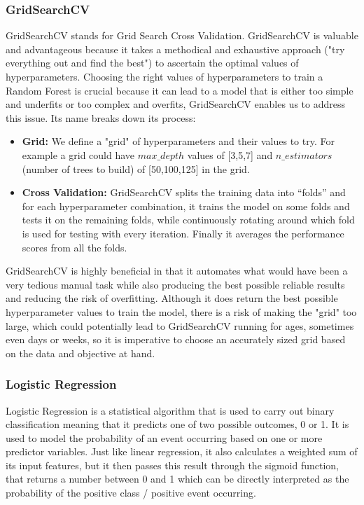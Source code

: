 	\subsubsection{GridSearchCV}
	GridSearchCV stands for Grid Search Cross Validation. GridSearchCV is valuable and advantageous because it takes a methodical and exhaustive approach ("try everything out and find the best") to ascertain the optimal values of hyperparameters. Choosing the right values of hyperparameters to train a Random Forest is crucial because it can lead to a model that is either too simple and underfits or too complex and overfits, GridSearchCV enables us to address this issue. Its name breaks down its process:
	\begin{itemize}
		\item \textbf{Grid:} We define a "grid" of hyperparameters and their values to try. For example a grid could have $max\_depth$ values of [3,5,7] and $n\_estimators$ (number of trees to build) of [50,100,125] in the grid.
		\item \textbf{Cross Validation:} GridSearchCV splits the training data into ``folds'' and for each hyperparameter combination, it trains the model on some folds and tests it on the remaining folds, while continuously rotating around which fold is used for testing with every iteration. Finally it averages the performance scores from all the folds. 
	\end{itemize}

	\noindent GridSearchCV is highly beneficial in that it automates what would have been a very tedious manual task while also producing the best possible reliable results and reducing the risk of overfitting. Although it does return the best possible hyperparameter values to train the model, there is a risk of making the "grid" too large, which could potentially lead to GridSearchCV running for ages, sometimes even days or  weeks, so it is imperative to choose an accurately sized grid based on the data and objective at hand.

	\subsubsection{Logistic Regression}
	\noindent Logistic Regression is a statistical algorithm that is used to carry out binary classification meaning that it predicts one of two possible outcomes, 0 or 1. It is used to model the probability of an event occurring based on one or more predictor variables. Just like linear regression, it also calculates a weighted sum of its input features, but it then passes this result through the sigmoid function, that returns a number between 0 and 1 which can be directly interpreted as the probability of the positive class / positive event occurring.
	
